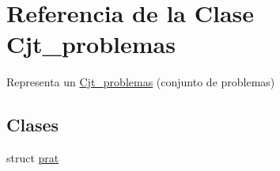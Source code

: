 \hypertarget{class_cjt__problemas}{}\section{Referencia de la Clase Cjt\+\_\+problemas}
\label{class_cjt__problemas}


Representa un \mbox{\hyperlink{class_cjt__problemas}{Cjt\+\_\+problemas}} (conjunto de problemas)  


\subsection*{Clases}
\begin{DoxyCompactItemize}
\item 
struct \mbox{\hyperlink{struct_cjt__problemas_1_1prat}{prat}}
\end{DoxyCompactItemize}
